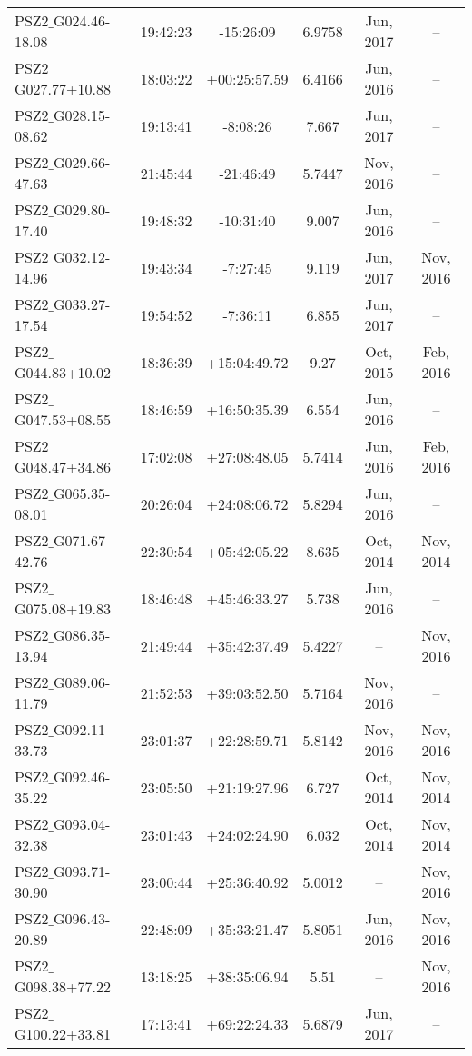 \documentclass[apj, revtex4]{emulateapj}
\begin{document}
\begin{longtable*}{lccccc}
	PSZ2$\_$G024.46-18.08 & 19:42:23 & -15:26:09 & 6.9758 & Jun, 2017 & -- \\
	PSZ2$\_$G027.77+10.88 & 18:03:22 & +00:25:57.59 & 6.4166 & Jun, 2016 & -- \\
	PSZ2$\_$G028.15-08.62 & 19:13:41 & -8:08:26 & 7.667 & Jun, 2017 & -- \\
	PSZ2$\_$G029.66-47.63 & 21:45:44 & -21:46:49 & 5.7447 & Nov, 2016 & -- \\
	PSZ2$\_$G029.80-17.40 & 19:48:32 & -10:31:40 & 9.007 & Jun, 2016 & -- \\
	PSZ2$\_$G032.12-14.96 & 19:43:34 & -7:27:45 & 9.119 & Jun, 2017 & Nov, 2016 \\
	PSZ2$\_$G033.27-17.54 & 19:54:52 & -7:36:11 & 6.855 & Jun, 2017 & -- \\
	PSZ2$\_$G044.83+10.02 & 18:36:39 & +15:04:49.72 & 9.27 & Oct, 2015 & Feb, 2016 \\
	PSZ2$\_$G047.53+08.55 & 18:46:59 & +16:50:35.39 & 6.554 & Jun, 2016 & -- \\
	PSZ2$\_$G048.47+34.86 & 17:02:08 & +27:08:48.05 & 5.7414 & Jun, 2016 & Feb, 2016 \\
	PSZ2$\_$G065.35-08.01 & 20:26:04 & +24:08:06.72 & 5.8294 & Jun, 2016 & -- \\
	PSZ2$\_$G071.67-42.76 & 22:30:54 & +05:42:05.22 & 8.635 & Oct, 2014 & Nov, 2014 \\
	PSZ2$\_$G075.08+19.83 & 18:46:48 & +45:46:33.27 & 5.738 & Jun, 2016 & -- \\
	PSZ2$\_$G086.35-13.94 & 21:49:44 & +35:42:37.49 & 5.4227 & -- & Nov, 2016 \\
	PSZ2$\_$G089.06-11.79 & 21:52:53 & +39:03:52.50 & 5.7164 & Nov, 2016 & -- \\
	PSZ2$\_$G092.11-33.73 & 23:01:37 & +22:28:59.71 & 5.8142 & Nov, 2016 & Nov, 2016 \\
	PSZ2$\_$G092.46-35.22 & 23:05:50 & +21:19:27.96 & 6.727 & Oct, 2014 & Nov, 2014 \\
	PSZ2$\_$G093.04-32.38 & 23:01:43 & +24:02:24.90 & 6.032 & Oct, 2014 & Nov, 2014 \\
	PSZ2$\_$G093.71-30.90 & 23:00:44 & +25:36:40.92 & 5.0012 & -- & Nov, 2016 \\
	PSZ2$\_$G096.43-20.89 & 22:48:09 & +35:33:21.47 & 5.8051 & Jun, 2016 & Nov, 2016 \\
	PSZ2$\_$G098.38+77.22 & 13:18:25 & +38:35:06.94 & 5.51 & -- & Nov, 2016 \\
	PSZ2$\_$G100.22+33.81 & 17:13:41 & +69:22:24.33 & 5.6879 & Jun, 2017 & -- \\

\end{longtable*}
\end{document}
